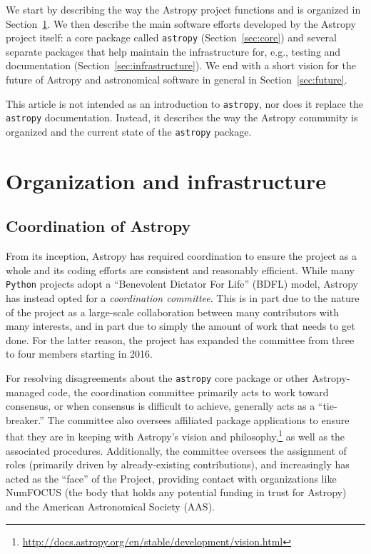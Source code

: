 \documentclass[modern]{aastex61}
\newcommand{\package}[1]{\texttt{#1}\xspace}
\newcommand{\python}{\package{Python}}
\newcommand{\astropy}{Astropy\xspace}
\newcommand{\astropypkg}{\package{astropy}}
\newcommand{\sectionname}{Section\xspace}
\begin{document}
We start by describing the way the \astropy project functions and is organized
in \sectionname~\ref{sec:org}. We then describe the main software efforts
developed by the \astropy project itself: a core package called \astropypkg
(\sectionname~\ref{sec:core}) and several separate packages that help maintain
the infrastructure for, e.g., testing and documentation
(\sectionname~\ref{sec:infrastructure}). We end with a short vision for
the future of \astropy and astronomical software in general in
\sectionname~\ref{sec:future}.

This article is not intended as an introduction to \astropypkg, nor does it
replace the \astropypkg documentation. Instead, it describes the way the
\astropy community is organized and the current state of the \astropypkg
package.

\section{Organization and infrastructure}
\label{sec:org}

\subsection{Coordination of Astropy}
\label{sect:coordcom}
From its inception, \astropy has required coordination to ensure the project
as a whole and its coding efforts are consistent and reasonably efficient.
While many \python projects adopt a ``Benevolent Dictator For Life'' (BDFL)
model, \astropy has instead opted for a \emph{coordination committee}.  This
is in part due to the nature of the project as a large-scale collaboration
between many contributors with many interests, and in part due to simply the
amount of work that needs to get done.  For the latter reason, the
project has expanded the committee from three to four members starting in
2016.

For resolving disagreements about the \astropypkg core package or other \astropy-managed code, the coordination committee primarily acts to work toward consensus, or when consensus is difficult to achieve, generally acts as a ``tie-breaker.''
The committee also oversees affiliated package applications to ensure that they
are in keeping with \astropy's vision and
philosophy,\footnote{\url{http://docs.astropy.org/en/stable/development/vision.html}}
as well as the associated procedures.
Additionally, the committee oversees the assignment of roles (primarily driven by already-existing contributions), and increasingly has acted as the ``face'' of the Project, providing contact with organizations like NumFOCUS (the body that holds any potential funding in trust for \astropy) and the American Astronomical Society (AAS).
\end{document}
